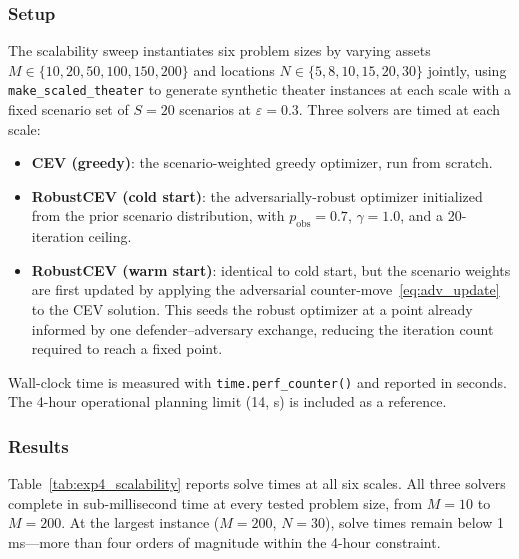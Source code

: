 \documentclass[11pt]{article}
\begin{document}
\subsubsection{Setup}

The scalability sweep instantiates six problem sizes by varying assets
$M \in \{10, 20, 50, 100, 150, 200\}$ and locations
$N \in \{5, 8, 10, 15, 20, 30\}$ jointly, using \texttt{make\_scaled\_theater}
to generate synthetic theater instances at each scale with a fixed scenario
set of $S = 20$ scenarios at $\varepsilon = 0.3$.
Three solvers are timed at each scale:

\begin{itemize}
    \item \textbf{CEV (greedy)}: the scenario-weighted greedy optimizer, run
          from scratch.
    \item \textbf{RobustCEV (cold start)}: the adversarially-robust optimizer
          initialized from the prior scenario distribution, with
          $p_{\mathrm{obs}} = 0.7$, $\gamma = 1.0$, and a 20-iteration ceiling.
    \item \textbf{RobustCEV (warm start)}: identical to cold start, but the
          scenario weights are first updated by applying the adversarial
          counter-move~\eqref{eq:adv_update} to the CEV solution.  This
          seeds the robust optimizer at a point already informed by one
          defender--adversary exchange, reducing the iteration count
          required to reach a fixed point.
\end{itemize}

Wall-clock time is measured with \texttt{time.perf\_counter()} and reported
in seconds.  The 4-hour operational planning limit (14, s) is included
as a reference.

\subsubsection{Results}

Table~\ref{tab:exp4_scalability} reports solve times at all six scales.
All three solvers complete in sub-millisecond time at every tested problem
size, from $M = 10$ to $M = 200$.  At the largest instance ($M = 200$,
$N = 30$), solve times remain below 1 ms---more than four orders of
magnitude within the 4-hour constraint.
\end{document}

